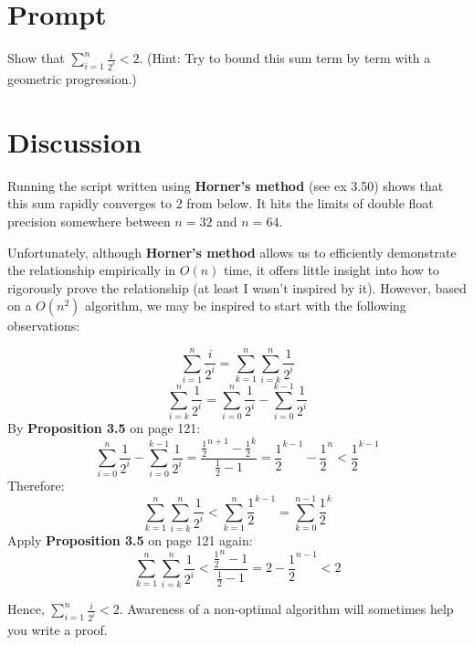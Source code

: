 \documentclass[11pt]{article}
\begin{document}
    \section{Prompt}

Show that $\sum_{i=1}^{n} \frac{i}{2^i} < 2$. (Hint: Try to bound this sum term by term with
a geometric progression.)

    \pagebreak

    \section{Discussion}

Running the script written using \textbf{Horner's method} (see ex 3.50) shows that this sum rapidly
converges to 2 from below. It hits the limits of double float precision somewhere between $n=32$
and $n=64$.

Unfortunately, although \textbf{Horner's method} allows us to efficiently demonstrate the relationship empirically in $O(n)$
time, it offers little insight into how to rigorously prove the relationship (at least I wasn't inspired by it).
However, based on a $O(n^2)$ algorithm, we may be inspired to start with the following observations:

$$\sum^n_{i=1} \frac{i}{2^i} = \sum^n_{k=1} \sum^n_{i=k} \frac{1}{2^i}$$
    $$\sum^n_{i=k} \frac{1}{2^i} = \sum^n_{i=0} \frac{1}{2^i} - \sum^{k-1}_{i=0} \frac{1}{2^i}$$
By \textbf{Proposition 3.5} on page 121:
$$\sum^n_{i=0} \frac{1}{2^i} - \sum^{k-1}_{i=0} \frac{1}{2^i} = \frac{\frac{1}{2}^{n+1}-\frac{1}{2}^{k}}{\frac{1}{2}-1} = \frac{1}{2}^{k-1}-\frac{1}{2}^{n} < \frac{1}{2}^{k-1}$$
Therefore:
$$\sum^n_{k=1} \sum^n_{i=k} \frac{1}{2^i} < \sum^n_{k=1} \frac{1}{2}^{k-1} = \sum^{n-1}_{k=0} \frac{1}{2}^{k}$$
Apply \textbf{Proposition 3.5} on page 121 again:
$$\sum^n_{k=1} \sum^n_{i=k} \frac{1}{2^i} < \frac{\frac{1}{2}^n - 1}{\frac{1}{2}-1} = 2 - \frac{1}{2}^{n-1} < 2$$

Hence, $\sum^n_{i=1} \frac{i}{2^i} < 2$. Awareness of a non-optimal algorithm will sometimes help you write a proof.
\end{document}
